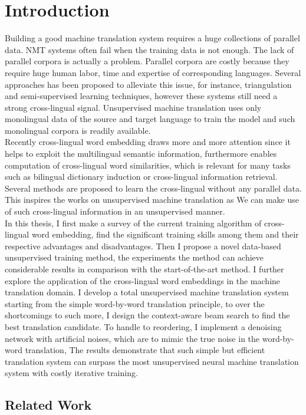 
\chapter{Introduction}
Building a good machine translation system requires a huge collections of parallel data. NMT systems often fail when the training data is not enough.  The lack of parallel corpora is actually a problem. Parallel corpora are costly because they require huge human labor, time and expertise of corresponding languages.
\indent Several approaches has been proposed to alleviate this issue, for instance, triangulation and semi-supervised learning techniques, however these systems still need a strong cross-lingual signal. Unsupervised machine translation uses only monolingual data of the source and target language to train the model and such monolingual corpora is readily available.\\
Recently cross-lingual word embedding draws more and more attention since it helps to exploit the multilingual semantic information, furthermore enables computation of cross-lingual word similarities, which is relevant for many tasks such as bilingual dictionary induction or cross-lingual information retrieval. Several methods are proposed to learn the cross-lingual without any parallel data. This inspires the works on unsupervised machine translation as We can make use of such cross-lingual information in an unsupervised manner.\\
In this thesis, I first make a survey of the current training algorithm of cross-lingual word embedding, find the significant training skills among them and their respective advantages and disadvantages. Then I propose a novel data-based unsupervised training method, the experiments the method can achieve considerable results  in comparison with the start-of-the-art method. I further explore the 
application of the cross-lingual word embeddings in the machine translation domain.
I develop a total unsupervised machine translation system starting from the simple word-by-word translation principle, to over the shortcomings to such more, I design the context-aware beam search to find the best translation candidate. To handle to reordering, I implement a denoising network with artificial noises, which are to mimic the true noise in the word-by-word translation, The results demonstrate that such simple but efficient translation system can surpass the most unsupervised neural machine translation system with costly iterative training.


\section{Related Work}

